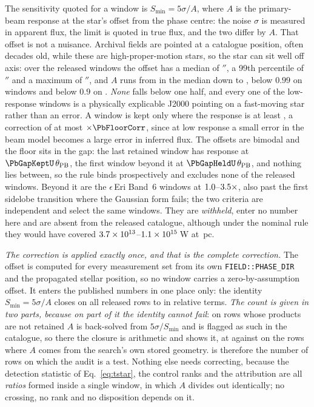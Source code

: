 The sensitivity quoted for a window is $S_{\min}=5\sigma/A$, where $A$ is the
primary-beam response at the star's offset from the phase centre: the noise
$\sigma$ is measured in apparent flux, the limit is quoted in true flux, and
the two differ by $A$. That offset is not a nuisance. Archival fields are
pointed at a catalogue position, often decades old, while these are
high-proper-motion stars, so the star can sit well off axis: over the
\PbNWin{} released windows the offset has a median of \PbOffMed$''$, a 99th
percentile of \PbOffPNN$''$ and a maximum of \PbOffMax$''$, and $A$ runs from
\PbAMed{} in the median down to \PbAMin, below $0.99$ on \PbNLowNN{} windows
and below $0.9$ on \PbNLowN. \emph{None} falls below one half, and every one
of the low-response windows is a physically explicable J2000 pointing on a
fast-moving star rather than an error. A window is kept only where the
response is at least \PbFloorResp, a correction of at most
$\times\PbFloorCorr$, since at low response a small error in the beam model
becomes a large error in inferred flux. The offsets are bimodal and the floor
sits in the gap: the last retained window has response \PbGapKeptResp{} at
$\PbGapKeptU\,\theta_{\rm PB}$, the first window beyond it \PbGapHeldResp{}
at $\PbGapHeldU\,\theta_{\rm PB}$, and nothing lies between, so the rule
binds prospectively and excludes none of the \NWindows{} released windows.
Beyond it are the \EpsEriNWin{} $\epsilon$\,Eri Band~6 windows at
$1.0$--$3.5\times$, also past the first sidelobe transition
where the Gaussian form fails; the two criteria are independent and select
the same windows. They are \emph{withheld}, enter no number here and are
absent from the released catalogue, although under the nominal rule they
would have covered $3.7\times10^{13}$--$1.1\times10^{15}$\,W at \EpsEriDistPc\,pc.

\emph{The correction is applied exactly once, and that is the complete
correction.} The offset is computed for every measurement set from its own
\texttt{FIELD::PHASE\_DIR} and the propagated stellar position, so no window
carries a zero-by-assumption offset. It enters the published numbers in one
place only: the identity $S_{\min}=5\sigma/A$ closes on all \PbSminClosed{}
released rows to \PbSminWorstRes{} in relative terms. \emph{The count is
given in two parts, because on part of it the identity cannot fail}: on
\PbSminTaut{} rows whose products are not retained $A$ is back-solved from
$5\sigma/S_{\min}$ and is flagged as such in the catalogue, so there the
closure is arithmetic and shows it, at \PbSminTautRes{} against
\PbSminIndepRes{} on the \PbSminIndep{} rows where $A$ comes from the
search's own stored geometry. \PbSminIndep{} is therefore the number of rows
on which the audit is a test. Nothing else needs correcting, because the
detection statistic of Eq.~\ref{eq:tstar}, the control ranks and the
attribution are all \emph{ratios} formed inside a single window, in which $A$
divides out identically; no crossing, no rank and no disposition depends on
it.

